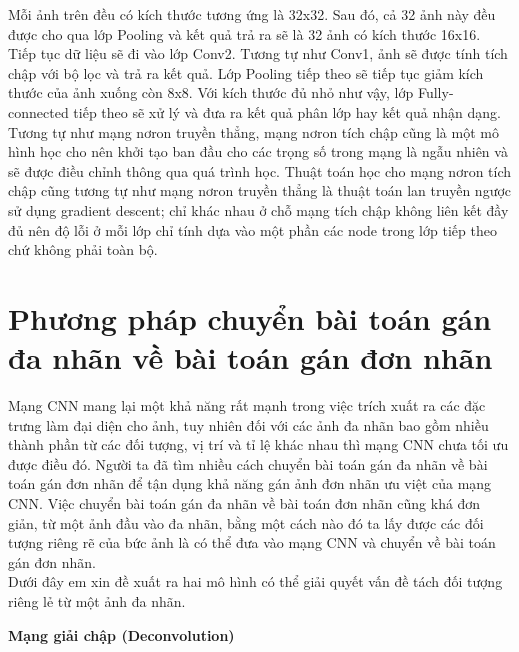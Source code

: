 \documentclass[13pt, a4paper]{extreport}
\begin{document}
\indent Mỗi ảnh trên đều có kích thước tương ứng là 32x32. Sau đó, cả 32 ảnh này đều được cho qua lớp Pooling và kết quả trả ra sẽ là 32 ảnh có kích thước 16x16.\\
\indent Tiếp tục dữ liệu sẽ đi vào lớp Conv2. Tương tự như Conv1, ảnh sẽ được tính tích chập với bộ lọc và trả ra kết quả. Lớp Pooling tiếp theo sẽ tiếp tục giảm kích thước của ảnh xuống còn 8x8. Với kích thước đủ nhỏ như vậy, lớp Fully-connected tiếp theo sẽ xử lý và đưa ra kết quả phân lớp hay kết quả nhận dạng.\\
\indent Tương tự như mạng nơron truyền thẳng, mạng nơron tích chập cũng là một mô hình học cho nên khởi tạo ban đầu cho các trọng số trong mạng là ngẫu nhiên và sẽ được điều chỉnh thông qua quá trình học. Thuật toán học cho mạng nơron tích chập cũng tương tự như mạng nơron truyền thẳng là thuật toán lan truyền ngược sử dụng gradient descent; chỉ khác nhau ở chỗ mạng tích chập không liên kết đầy đủ nên độ lỗi ở mỗi lớp chỉ tính dựa vào một phần các node trong lớp tiếp theo chứ không phải toàn bộ.
\section{Phương pháp chuyển bài toán gán đa nhãn về bài toán gán đơn nhãn}
\indent Mạng CNN mang lại một khả năng rất mạnh trong việc trích xuất ra các đặc trưng làm đại diện cho ảnh, tuy nhiên đối với các ảnh đa nhãn bao gồm nhiều thành phần từ các đối tượng, vị trí và tỉ lệ khác nhau thì mạng CNN chưa tối ưu được điều đó. Người ta đã tìm nhiều cách chuyển bài toán gán đa nhãn về bài toán gán đơn nhãn để tận dụng khả năng gán ảnh đơn nhãn ưu việt của mạng CNN. Việc chuyển bài toán gán đa nhãn về bài toán đơn nhãn cũng khá đơn giản, từ một ảnh đầu vào đa nhãn, bằng một cách nào đó ta lấy được các đối tượng riêng rẽ của bức ảnh là có thể đưa vào mạng CNN và chuyển về bài toán gán đơn nhãn.\\
\indent Dưới đây em xin đề xuất ra hai mô hình có thể giải quyết vấn đề tách đối tượng riêng lẻ từ một ảnh đa nhãn.

\vspace{0.15cm}
\indent \textbf{Mạng giải chập (Deconvolution)}
\end{document}
